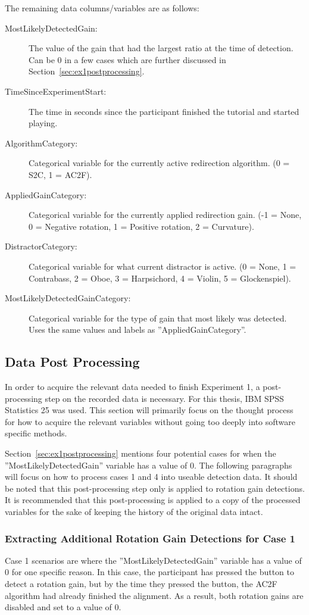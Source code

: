 The remaining data columns/variables are as follows:
\begin{description}
   \item[MostLikelyDetectedGain:] The value of the gain that had the largest ratio at the time of detection. Can be 0 in a few cases which are further discussed in Section~\ref{sec:ex1postprocessing}.
   \item[TimeSinceExperimentStart:] The time in seconds since the participant finished the tutorial and started playing.
   \item[AlgorithmCategory:] Categorical variable for the currently active redirection algorithm. (0 = S2C, 1 = AC2F).
   \item[AppliedGainCategory:] Categorical variable for the currently applied redirection gain. (-1 = None, 0 = Negative rotation, 1 = Positive rotation, 2 = Curvature).
   \item[DistractorCategory:] Categorical variable for what current distractor is active. (0 = None, 1 = Contrabass, 2 = Oboe, 3 = Harpsichord, 4 = Violin, 5 = Glockenspiel).
   \item[MostLikelyDetectedGainCategory:] Categorical variable for the type of gain that most likely was detected. Uses the same values and labels as ''AppliedGainCategory''.
\end{description}

\subsection{Data Post Processing}\label{sec:ex1postprocessingdetails}
In order to acquire the relevant data needed to finish Experiment 1, a post-processing step on the recorded data is necessary. For this thesis, IBM SPSS Statistics 25 was used. This section will primarily focus on the thought process for how to acquire the relevant variables without going too deeply into software specific methods. 

Section~\ref{sec:ex1postprocessing} mentions four potential cases for when the ''MostLikelyDetectedGain'' variable has a value of 0. The following paragraphs will focus on how to process cases 1 and 4 into useable detection data. It should be noted that this post-processing step only is applied to rotation gain detections. It is recommended that this post-processing is applied to a copy of the processed variables for the sake of keeping the history of the original data intact. 

\subsubsection{Extracting Additional Rotation Gain Detections for Case 1}
Case 1 scenarios are where the ''MostLikelyDetectedGain'' variable has a value of 0 for one specific reason. In this case, the participant has pressed the button to detect a rotation gain, but by the time they pressed the button, the AC2F algorithm had already finished the alignment. As a result, both rotation gains are disabled and set to a value of 0. 

